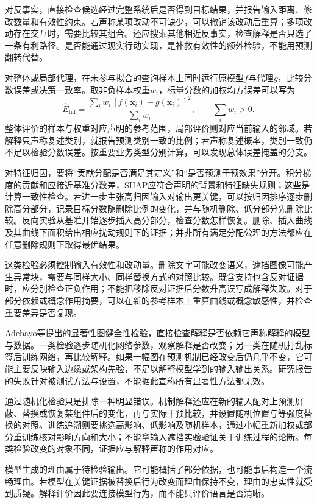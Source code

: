 对反事实，直接检查候选经过完整系统后是否得到目标结果，并报告输入距离、修改数量和有效性约束。若声称某项改动不可缺少，可以撤销该改动后重算；多项改动存在交互时，需要比较其组合。还应搜索其他相近反事实，检查解释是否只选了一条有利路径。是否能通过现实行动实现，是补救有效性的额外检验，不能用预测翻转代替。

对整体或局部代理，在未参与拟合的查询样本上同时运行原模型$f$与代理$g$，比较分数误差或决策一致率。取非负样本权重$w_i$，标量分数的加权均方误差可以写为
\[
 \widehat E_{\mathrm{fid}}
 =\frac{\sum_i w_i\,[f(\bm{x}_i)-g(\bm{x}_i)]^2}
        {\sum_i w_i},\qquad \sum_iw_i>0.
\]
整体评价的样本与权重对应声明的参考范围，局部评价则对应当前输入的邻域。若解释只声称复述类别，就报告预测类别一致的比例；若声称复述概率，类别一致仍不足以检验分数误差。按重要业务类型分别计算，可以发现总体误差掩盖的分支。

对特征归因，要将“贡献分配是否满足其定义”和“是否预测干预效果”分开。积分梯度的贡献和应接近基准分数差，SHAP应符合声明的背景和特征缺失规则；这些是计算一致性检查。若进一步主张高归因输入对输出更关键，可以按归因排序逐步删除高分部分，记录目标分数随删除比例的变化，并与随机删除、低分部分先删除比较。反向实验从基准开始逐步插入高分部分，检查分数怎样恢复。删除、插入曲线及其曲线下面积给出相应扰动规则下的证据；并非所有满足分配公理的方法都应在任意删除规则下取得最优结果。

这类检验必须控制输入有效性和改动量。删除文字可能改变语义，遮挡图像可能产生异常块，需要与同样大小、同样替换方式的对照比较。既含支持也含反对证据时，应分别检查正负作用；不能把移除反对证据后分数升高误写成解释失败。对于部分依赖或概念作用摘要，可以在新的参考样本上重算曲线或概念敏感性，并检查重要差异是否复现。

Adebayo等提出的显著性图健全性检验，直接检查解释是否依赖它声称解释的模型与数据。一类检验逐步随机化网络参数，观察解释是否改变；另一类在随机打乱标签后训练网络，再比较解释。如果一幅图在预测机制已经改变后仍几乎不变，它可能主要反映输入边缘或架构先验，不足以解释模型学到的输入输出关系。研究报告的失败针对被测试方法与设置，不能据此宣称所有显著性方法都无效。

通过随机化检验只是排除一种明显错误。机制解释还应在新的输入配对上预测屏蔽、替换或恢复某组件后的变化，再与实际干预比较，并设置随机位置与等强度替换的对照。训练追溯则要挑选高影响、低影响及随机样本，通过小幅重新加权或部分重训练核对影响方向和大小；不能拿输入遮挡实验验证关于训练过程的论断。每类检验改变的对象不同，证据应与解释声称的作用对应。

模型生成的理由属于待检验输出。它可能概括了部分依据，也可能事后构造一个流畅理由。若模型在关键证据被替换后行为改变而理由保持不变，理由的忠实性就受到质疑。解释评价因此要连接模型行为，而不能只评价语言是否清晰。

